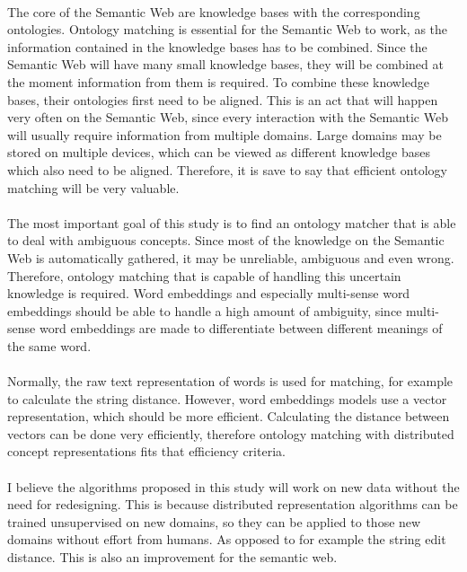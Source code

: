 \documentclass{article}
\begin{document}
 \paragraph{}
 The core of the Semantic Web are knowledge bases with the corresponding ontologies. Ontology matching is essential for the Semantic Web to work, as the information contained in the knowledge bases has to be combined. Since the Semantic Web will have many small knowledge bases, they will be combined at the moment information from them is required. To combine these knowledge bases, their ontologies first need to be aligned. This is an act that will happen very often on the Semantic Web, since every interaction with the Semantic Web will usually require information from multiple domains. Large domains may be stored on multiple devices, which can be viewed as different knowledge bases which also need to be aligned. Therefore, it is save to say that efficient ontology matching will be very valuable.
 \paragraph{}
 The most important goal of this study is to find an ontology matcher that is able to deal with ambiguous concepts. Since most of the knowledge on the Semantic Web is automatically gathered, it may be unreliable, ambiguous and even wrong. Therefore, ontology matching that is capable of handling this uncertain knowledge is required. Word embeddings and especially multi-sense word embeddings should be able to handle a high amount of ambiguity, since multi-sense word embeddings are made to differentiate between different meanings of the same word.
 \paragraph{}
 Normally, the raw text representation of words is used for matching, for example to calculate the string distance. However, word embeddings models use a vector representation, which should be more efficient.
 Calculating the distance between vectors can be done very efficiently, therefore ontology matching with distributed concept representations fits that efficiency criteria. 
 \paragraph{}
 I believe the algorithms proposed in this study will work on new data without the need for redesigning. This is because distributed representation algorithms can be trained unsupervised on new domains, so they can be applied to those new domains without effort from humans. As opposed to for example the string edit distance. This is also an improvement for the semantic web.
\end{document}
